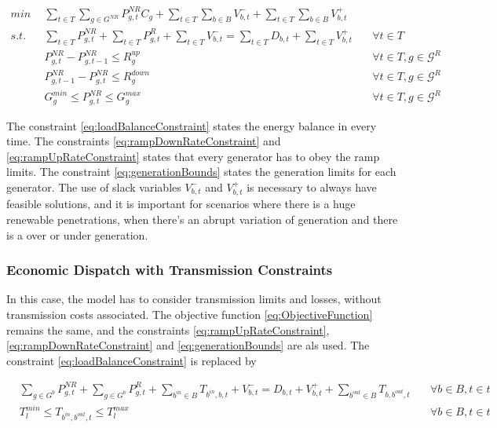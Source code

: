 \documentclass[12pt,LUDisStyle,twosided]{book}
\newcommand{\mc}{\mathcal}
\begin{document}
\begin{subequations}\label{model:simple_ED}
\begin{alignat}{4}
min ~~& \sum_{t \in T}\sum_{g \in G^{NR}} P^{NR}_{g,t} C_{g} + \sum_{t \in T}\sum_{b \in B} V^{-}_{b,t} + \sum_{t \in T}\sum_{b \in B} V^{+}_{b,t} \label{eq:ObjectiveFunction} \\
s.t. ~~~& \sum_{t \in T} P^{NR}_{g,t} + \sum_{t \in T} P^{R}_{g,t} + \sum_{t \in T}V^{-}_{b,t} = \sum_{t \in T} D_{b,t}  + \sum_{t \in T}V^{+}_{b,t}  &~& \forall t \in T  \label{eq:loadBalanceConstraint} \\
& P^{NR}_{g,t} - P^{NR}_{g,t - 1} \leq R^{up}_{g} &~& \forall t \in T, g \in \mc{G}^{R}\label{eq:rampUpRateConstraint} \\
& P^{NR}_{g,t -1 } - P^{NR}_{g,t} \leq R^{down}_{g} &~& \forall t \in T, g \in \mc{G}^{R}\label{eq:rampDownRateConstraint} \\
& G^{min}_{g}\leq P^{NR}_{g,t} \leq G^{max}_{g} &~& \forall t \in T, g \in \mc{G}^{R}\label{eq:generationBounds}
\end{alignat} 
\end{subequations}

The constraint \ref{eq:loadBalanceConstraint} states the energy balance in every time. The constraints \ref{eq:rampDownRateConstraint} and \ref{eq:rampUpRateConstraint} states that every generator has to obey the ramp limits. The constraint \ref{eq:generationBounds} states the generation limits for each generator. The use of slack variables $V^{-}_{b,t}$ and $V^{+}_{b,t}$ is necessary to always have feasible solutions, and it is important for scenarios where there is a huge renewable penetrations, when there's an abrupt variation of generation and there is a over or under generation.   

\subsubsection{Economic Dispatch with Transmission Constraints}

In this case, the model has to consider transmission limits and losses, without transmission costs associated. The objective function \ref{eq:ObjectiveFunction} remains the same, and the constraints \ref{eq:rampUpRateConstraint}, \ref{eq:rampDownRateConstraint} and \ref{eq:generationBounds} are als used. The constraint \ref{eq:loadBalanceConstraint} is replaced by  

\begin{subequations}\label{model:edTransmissionConstraints}
\begin{alignat}{4}
&\sum_{g \in G^{b}} P^{NR}_{g,t} + \sum_{g \in G^{b}} P^{R}_{g,t} + \sum_{b^{in} \in B} T_{b^{in},b,t} + V^{-}_{b,t} = D_{b,t}  + V^{+}_{b,t} + \sum_{b^{out} \in B} T_{b,b^{out},t}  &~& \forall b \in B, t \in t \label{eq:transmissionBalanceConstraint} \\
& T^{min}_{l} \leq T_{b^{in},b^{out},t} \leq T^{max}_{l}  &~& \forall b \in B, t \in t \label{eq:transmissionLimits}
\end{alignat} 
\end{subequations}
\end{document}
